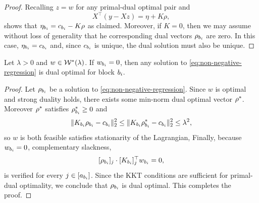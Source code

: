 \begin{proof}
    Recalling \( z = w \) for any primal-dual optimal pair and
    \[
        X^\top (y - X z) = \eta + K \rho,
    \]
    shows that \( \eta_{b_i} = c_{b_i} - K \rho \) as claimed.
    Moreover, if \( K = 0 \), then we may assume without loss of generality
    that he corresponding dual vectors \( \rho_{{b_i}} \) are zero.
    In this case, \( \eta_{b_i} = c_{b_i} \) and,
    since \( c_{b_i} \) is unique, the dual solution must also be unique.
\end{proof}

\begin{proposition}\label{prop:non-negative-regression}
    Let \( \lambda > 0 \) and \( w \in \mathcal{W}^*(\lambda) \).
    If \( w_{b_i} = 0 \), then any solution to \cref{eq:non-negative-regression}
    is dual optimal for block \( {b_i} \).
\end{proposition}
\begin{proof}
    Let \( \rho_{{b_i}} \) be a solution to \cref{eq:non-negative-regression}.
    Since \( w \) is optimal and strong duality holds, there exists
    some min-norm dual optimal vector \( \rho^* \).
    Moreover \( \rho^* \) satisfies \( \rho^*_{b_i} \geq 0 \) and
    \[
        \|K_{{b_i}} \rho_{{b_i}} - c_{b_i}\|^2_2 \leq \|K_{{b_i}} \rho^*_{b_i} - c_{b_i}\|^2_2 \leq \lambda^2,
    \]
    so \( w \) is both feasible satisfies stationarity of the Lagrangian,
    Finally, because \( w_{b_i} = 0 \), complementary slackness,
    \[
        [\rho_{{b_i}}]_j \cdot [K_{{b_i}}]_j^\top w_{b_i} = 0,
    \]
    is verified for every \( j \in [a_{b_i}] \).
    Since the KKT conditions are sufficient for primal-dual optimality, we
    conclude that \( \rho_{{b_i}} \) is dual optimal.
    This completes the proof.
\end{proof}

